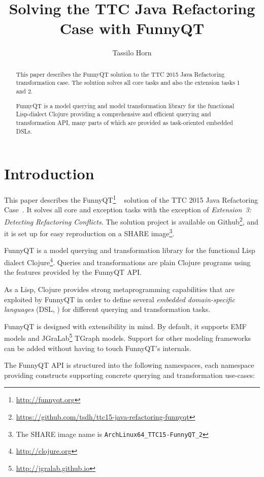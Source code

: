\documentclass[submission]{eptcs}
\title{Solving the TTC Java Refactoring Case with FunnyQT}
\author{Tassilo Horn
  \institute{Institute for Software Technology, University Koblenz-Landau, Germany}
  \email{horn@uni-koblenz.de}}
\begin{document}
\maketitle

\begin{abstract}
  This paper describes the FunnyQT solution to the TTC 2015 Java Refactoring
  transformation case.  The solution solves all core tasks and also the
  extension tasks 1 and 2.

  FunnyQT is a model querying and model transformation library for the
  functional Lisp-dialect Clojure providing a comprehensive and efficient
  querying and transformation API, many parts of which are provided as
  task-oriented embedded DSLs.
\end{abstract}


\section{Introduction}
\label{sec:introduction}

This paper describes the FunnyQT\footnote{\url{http://funnyqt.org}}
~\cite{Horn2013MQWFQ,funnyqt-icgt15} solution of the TTC 2015 Java Refactoring
Case~\cite{java-refactoring-case-desc}.  It solves all core and exception tasks
with the exception of \emph{Extension~3: Detecting Refactoring Conflicts}.  The
solution project is available on
Github\footnote{\url{https://github.com/tsdh/ttc15-java-refactoring-funnyqt}},
and it is set up for easy reproduction on a SHARE image\footnote{The SHARE
  image name is \verb|ArchLinux64_TTC15-FunnyQT_2|}.

FunnyQT is a model querying and transformation library for the functional Lisp
dialect Clojure\footnote{\url{http://clojure.org}}.  Queries and
transformations are plain Clojure programs using the features provided by the
FunnyQT API.

As a Lisp, Clojure provides strong metaprogramming capabilities that are
exploited by FunnyQT in order to define several \emph{embedded domain-specific
  languages} (DSL, \cite{book:Fowler2010DSL}) for different querying and
transformation tasks.

FunnyQT is designed with extensibility in mind.  By default, it supports EMF
\cite{Steinberg2008EEM} models and
JGraLab\footnote{\url{http://jgralab.github.io}} TGraph models.  Support for
other modeling frameworks can be added without having to touch FunnyQT's
internals.

The FunnyQT API is structured into the following namespaces, each namespace
providing constructs supporting concrete querying and transformation use-cases:
\end{document}
